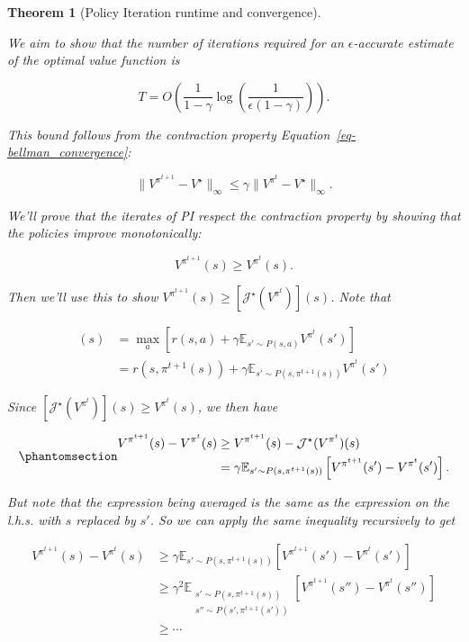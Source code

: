 \documentclass[
  letterpaper,
  DIV=11,
  numbers=noendperiod]{scrreprt}
\theoremstyle{plain}
\theoremstyle{plain}
\newtheorem{theorem}{Theorem}[chapter]
\theoremstyle{definition}
\theoremstyle{definition}
\theoremstyle{remark}
\begin{document}
\begin{theorem}[Policy Iteration runtime and
convergence]\protect\hypertarget{thm-pi_iter_analysis}{}\label{thm-pi_iter_analysis}

We aim to show that the number of iterations required for an
\(\epsilon\)-accurate estimate of the optimal value function is

\[T = O\left( \frac{1}{1-\gamma} \log\left(\frac{1}{\epsilon (1-\gamma)}\right) \right).\]

This bound follows from the contraction property
Equation~\ref{eq-bellman_convergence}:

\[\|V^{\pi^{t+1}} - V^\star \|_{\infty} \le \gamma \|V^{\pi^{t}} - V^\star \|_{\infty}.\]

We'll prove that the iterates of PI respect the contraction property by
showing that the policies improve monotonically:

\[V^{\pi^{t+1}}(s) \ge V^{\pi^{t}}(s).\]

Then we'll use this to show
\(V^{\pi^{t+1}}(s) \ge [\mathcal{J}^{\star}(V^{\pi^{t}})](s)\). Note
that

\[
\begin{aligned}
(s) &= \max_a \left[ r(s, a) + \gamma \mathbb{E}_{s' \sim P(s, a)} V^{\pi^{t}}(s') \right] \\
    &= r(s, \pi^{t+1}(s)) + \gamma \mathbb{E}_{s' \sim P(s, \pi^{t+1}(s))} V^{\pi^{t}}(s')
\end{aligned}
\]

Since \([\mathcal{J}^{\star}(V^{\pi^{t}})](s) \ge V^{\pi^{t}}(s)\), we
then have

\begin{equation}\phantomsection\label{eq-pi_iter_proof}{
\begin{aligned}
    V^{\pi^{t+1}}(s) - V^{\pi^{t}}(s) &\ge V^{\pi^{t+1}}(s) - \mathcal{J}^{\star} (V^{\pi^{t}})(s) \\
    &= \gamma \mathbb{E}_{s' \sim P(s, \pi^{t+1}(s))} \left[V^{\pi^{t+1}}(s') -  V^{\pi^{t}}(s') \right].
\end{aligned}
}\end{equation}

But note that the expression being averaged is the same as the
expression on the l.h.s. with \(s\) replaced by \(s'\). So we can apply
the same inequality recursively to get

\[
\begin{aligned}
    V^{\pi^{t+1}}(s) - V^{\pi^{t}}(s) &\ge  \gamma \mathbb{E}_{s' \sim P(s, \pi^{t+1}(s))} \left[V^{\pi^{t+1}}(s') -  V^{\pi^{t}}(s') \right] \\
    &\ge \gamma^2 \mathbb{E}_{\substack{s' \sim P(s, \pi^{t+1}(s)) \\ s'' \sim P(s', \pi^{t+1}(s'))}} \left[V^{\pi^{t+1}}(s'') -  V^{\pi^{t}}(s'') \right]\\
    &\ge \cdots
\end{aligned}
\]


\end{theorem}
\end{document}
